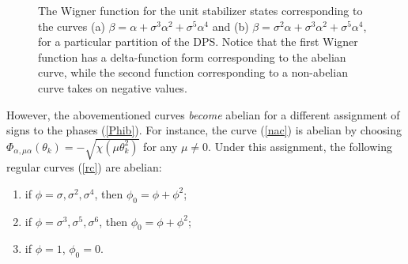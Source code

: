 \documentclass[quantumrep,article,submit,pdftex,moreauthors]{Definitions/mdpi}
\begin{document}
\begin{figure}[ht]%
    \centering
	\quad
	\caption{The Wigner function for the unit stabilizer states corresponding to
		the curves (a) $\beta = \alpha + \sigma^3 \alpha^2 + \sigma^5 \alpha^4$
		and (b) $\beta = \sigma^2 \alpha + \sigma^3 \alpha^2 +
		\sigma^{5}\alpha^{4}$, for a particular partition of the
		DPS. Notice that the first Wigner function has a delta-function form
		corresponding to the abelian curve, while the second function
		corresponding to a non-abelian curve takes on negative values.}%
    \label{fig1}%
\end{figure}

However, the abovementioned curves \textit{become} abelian for a different
assignment of signs to the phases (\ref{Phib}). For instance, the curve
(\ref{nac}) is abelian by choosing $\Phi_{\alpha,\mu \alpha }(\theta_{k}) =
-\sqrt{\chi\left(\mu \theta_{k}^{2}\right)}$ for any $\mu \neq 0$. Under this
assignment, the following regular curves (\ref{rc}) are abelian:

\begin{enumerate}
  \item if $\phi = \sigma, \sigma^{2}, \sigma^{4}$, then $\phi_{0} = \phi +
    \phi^{2}$;
  \item if $\phi = \sigma^{3}, \sigma^{5}, \sigma^{6}$, then $\phi_{0} = \phi +
  \phi^{2}$;
  \item if $\phi = 1$, $\phi_{0} = 0$.
\end{enumerate}
\end{document}
